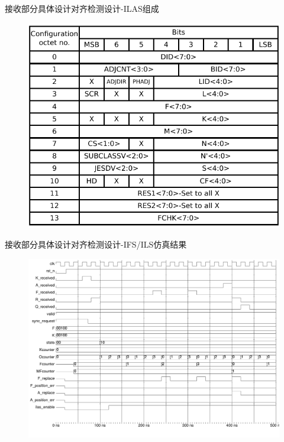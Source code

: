 \documentclass{beamer}
\begin{document}
\begin{frame}{接收部分具体设计}{对齐检测设计-ILAS组成}
  \begin{figure}
  \includegraphics[scale=0.6]{./img/mapping_link_configuration_fields.pdf}
  \end{figure}
\end{frame}

\begin{frame}{接收部分具体设计}{对齐检测设计-IFS/ILS仿真结果}
  \begin{figure}
  \includegraphics[scale=0.3]{./img/ifs_detection_wave.pdf}
  \end{figure}
\end{frame}
\end{document}
